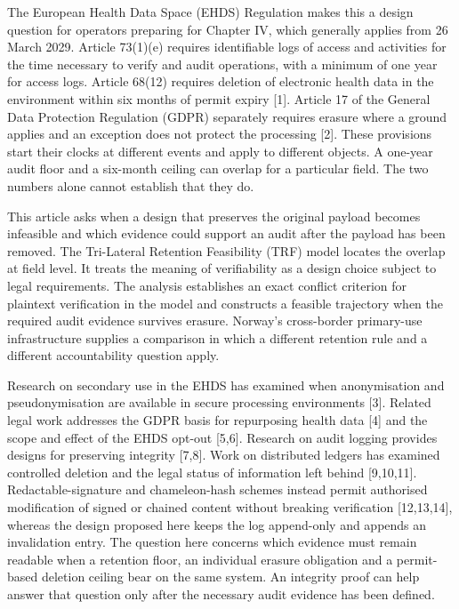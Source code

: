 \documentclass[preprint,review,12pt]{elsarticle}
\begin{document}
The European Health Data Space (EHDS) Regulation makes this a design
question for operators preparing for Chapter IV, which generally applies
from 26 March 2029. Article 73(1)(e) requires identifiable logs of
access and activities for the time necessary to verify and audit
operations, with a minimum of one year for access logs. Article 68(12)
requires deletion of electronic health data in the environment within
six months of permit expiry {[}1{]}. Article 17 of the General Data
Protection Regulation (GDPR) separately requires erasure where a ground
applies and an exception does not protect the processing {[}2{]}. These
provisions start their clocks at different events and apply to different
objects. A one-year audit floor and a six-month ceiling can overlap for
a particular field. The two numbers alone cannot establish that they do.

This article asks when a design that preserves the original payload
becomes infeasible and which evidence could support an audit after the
payload has been removed. The Tri-Lateral Retention Feasibility (TRF)
model locates the overlap at field level. It treats the meaning of
verifiability as a design choice subject to legal requirements. The
analysis establishes an exact conflict criterion for plaintext
verification in the model and constructs a feasible trajectory when the
required audit evidence survives erasure. Norway's cross-border
primary-use infrastructure supplies a comparison in which a different
retention rule and a different accountability question apply.

Research on secondary use in the EHDS has examined when anonymisation
and pseudonymisation are available in secure processing environments
{[}3{]}. Related legal work addresses the GDPR basis for repurposing
health data {[}4{]} and the scope and effect of the EHDS opt-out
{[}5,6{]}. Research on audit logging provides designs for preserving
integrity {[}7,8{]}. Work on distributed ledgers has examined controlled
deletion and the legal status of information left behind {[}9,10,11{]}.
Redactable-signature and chameleon-hash schemes instead permit
authorised modification of signed or chained content without breaking
verification {[}12,13,14{]}, whereas the design proposed here keeps the
log append-only and appends an invalidation entry. The question here
concerns which evidence must remain readable when a retention floor, an
individual erasure obligation and a permit-based deletion ceiling bear
on the same system. An integrity proof can help answer that question
only after the necessary audit evidence has been defined.
\end{document}
